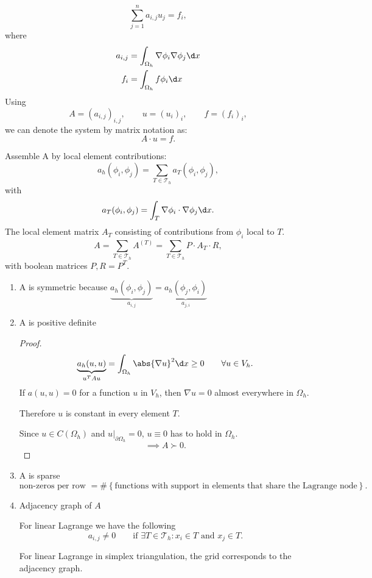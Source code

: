 \[
\sum_{j=1}^{n}{a_{i,j}u_{j}=f_{i}}
,\] 
where
\begin{align*}
	a_{i,j}&= \int_{\Omega _{h}}\nabla \phi _{i}\nabla \phi _{j} \d x \\
f_{i}&=\int_{\Omega _{h}}f \phi _{i} \d x
\end{align*}
Using
\[
	A = (a_{i,j})_{i,j}, \qquad u=(u_{i})_{i}, \qquad f=(f_{i})_{i}
,\] 
we can denote the system by matrix notation as:
\[
A \cdot u = f
.\] 

Assemble A by local element contributions:
\[
	a_{h}(\phi _{i}, \phi _{j}) = \sum_{T \in \mathcal{T}_{h}}^{}{a_{T}(\phi _{i}, \phi _{j})}
,\] 
with
\[
	a_{T}(\phi _{i}, \phi _{j}) = \int_{T}\nabla \phi _{i}\cdot \nabla \phi _{j} \d x
.\]
The local element matrix $A_{T}$ consisting of contributions from $\phi _{i}$ local to $T$.
\[
	A = \sum_{T \in \mathcal{T}_{h}}^{}{A^{(T)}}= \sum_{T \in \mathcal{T}_{h}}^{}{P\cdot A_{T} \cdot R}
,\] 
with boolean matrices $P, R = P^{T}$.


\begin{enumerate}[label=\alph{enumi})]
	\item A is symmetric because $ \underbrace{a_{h}(\phi
		_{i}, \phi _{j})}_{a_{i,j}} =
		\underbrace{a_{h}(\phi _{j}, \phi _{i})}_{a_{j,i}}
		$
	\item A is positive definite
		\begin{proof}
		\label{thm:Aispositivedefinite}
			\[
					\underbrace{a_{h}(u,u)}_{u^{T}Au} = \int_{\Omega_{h} }\abs{\nabla u} ^2 \d x \geq 0 \qquad \forall u \in V_{h}
			.\] 
			If  $a(u,u)=0$ for a function $u$ in $V_{h}$, then $\nabla u=0$ almost everywhere in $\Omega _{h}$.

			Therefore $u$ is constant in every element $T$.

			Since $u \in C(\Omega _{h})$ and $u|_{\partial \Omega _{h}}=0$, $u \equiv 0$ has to hold in $\Omega _{h}$.
			\[
			\implies A \succ 0
			.\] 
		\end{proof}

	\item A is sparse
		\[
		\text{non-zeros per row } = \#\left\{ \text{functions with support in elements that share the Lagrange node} \right\} 
		.\] 
	\item Adjacency graph of $A$

		
		For linear Lagrange we have the following
		\[
		a_{i,j}\neq 0 \qquad \text{if } \exists T \in \mathcal{T}_{h}\colon x_{i}\in T \text{ and } x_{j} \in T
		.\] 

		For linear Lagrange in simplex triangulation, the grid corresponds to the adjacency graph.
\end{enumerate}

